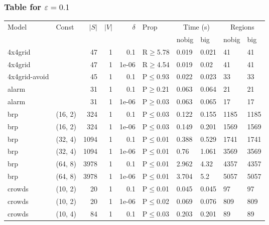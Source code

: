 \subsubsection{Table for \(\varepsilon=0.1\)}
\begin{longtable}{llrrrlllll}

        \toprule
        Model & Const & $|S|$ & $|V|$ & $\delta$ & Prop & \multicolumn{2}{c}{Time (s)} & \multicolumn{2}{c}{Regions} \\
        \cmidrule(ll){7-8} \cmidrule(ll){9-10}
        & & & & & & nobig & big & nobig & big \\
        \midrule
        
 4x4grid       &           &     	47 & 1 & 0.1   & R$\geq$5.78  & 0.019  & 0.021  & 41      & 41      \\
 4x4grid       &           &     	47 & 1 & 1e-06 & R$\geq$4.54  & 0.019  & 0.02   & 41      & 41      \\
 4x4grid-avoid &           &     	45 & 1 & 0.1   & P$\leq$0.93  & 0.022  & 0.023  & 33      & 33      \\
 alarm         &           &     	31 & 1 & 0.1   & P$\geq$0.21  & 0.063  & 0.064  & 21      & 21      \\
 alarm         &           &     	31 & 1 & 1e-06 & P$\geq$0.03  & 0.063  & 0.065  & 17      & 17      \\
 brp           & (16, 2)   &    	324 & 1 & 0.1   & P$\leq$0.03  & 0.122  & 0.155  & 1185    & 1185    \\
 brp           & (16, 2)   &    	324 & 1 & 1e-06 & P$\leq$0.03  & 0.149  & 0.201  & 1569    & 1569    \\
 brp           & (32, 4)   &   	1094 & 1 & 0.1   & P$\leq$0.01  & 0.388  & 0.529  & 1741    & 1741    \\
 brp           & (32, 4)   &   	1094 & 1 & 1e-06 & P$\leq$0.01  & 0.76   & 1.061  & 3569    & 3569    \\
 brp           & (64, 8)   &   	3978 & 1 & 0.1   & P$\leq$0.01  & 2.962  & 4.32   & 4357    & 4357    \\
 brp           & (64, 8)   &   	3978 & 1 & 1e-06 & P$\leq$0.01  & 3.704  & 5.2    & 5057    & 5057    \\
 crowds        & (10, 2)   &     	20 & 1 & 0.1   & P$\leq$0.01  & 0.045  & 0.045  & 97      & 97      \\
 crowds        & (10, 2)   &     	20 & 1 & 1e-06 & P$\leq$0.02  & 0.069  & 0.076  & 809     & 809     \\
 crowds        & (10, 4)   &     	84 & 1 & 0.1   & P$\leq$0.03  & 0.203  & 0.201  & 89      & 89      \\

\end{longtable}
